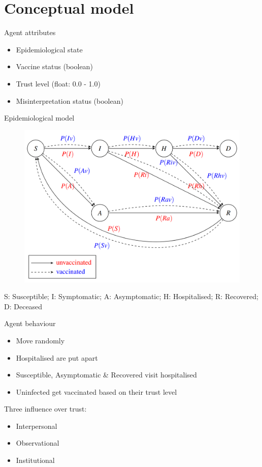 \documentclass{beamer}
\begin{document}
\section{Conceptual model}

\begin{frame}{Agent attributes}
    \begin{itemize}
        \item Epidemiological state
        \item Vaccine status (boolean)
        \item Trust level (float: 0.0 - 1.0)
        \item Misinterpretation status (boolean)
    \end{itemize}
\end{frame}

\begin{frame}{Epidemiological model}
    \begin{figure}
        \begin{center}
            \includegraphics[width=0.8\linewidth]{fig/SIAHRD.png}
        \end{center}
    \end{figure}
    S: Susceptible; I: Symptomatic; A: Asymptomatic; H: Hospitalised; R: Recovered; D: Deceased
\end{frame}

\begin{frame}{Agent behaviour}
    \begin{itemize}
        \item Move randomly
        \item Hospitalised are put apart
        \item Susceptible, Asymptomatic \& Recovered visit hospitalised
        \item Uninfected get vaccinated based on their trust level
    \end{itemize}
    \vspace{1.5\baselineskip}
    Three influence over trust:
    \begin{itemize}
        \item Interpersonal
        \item Observational
        \item Institutional
    \end{itemize}
\end{frame}
\end{document}
